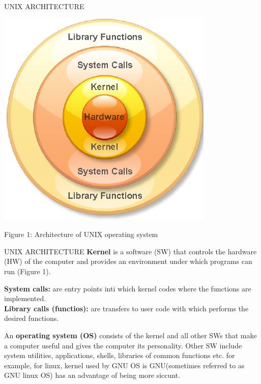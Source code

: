 \documentclass{beamer}
\begin{document}
\begin{frame}[t]{UNIX ARCHITECTURE}\vspace{10pt}
\begin{center}
\includegraphics[scale=0.5]{kernel.png}
\end{center}
Figure 1: Architecture of UNIX operating system

\end{frame}


\begin{frame}[t]{UNIX ARCHITECTURE}\vspace{4pt}
\textbf{Kernel} is a software (SW) that controls the hardware (HW) of the computer and provides an environment under which programs can run (Figure 1).

\textbf{System calls:} are entry points inti which kernel codes where the functions are implemented.\\[6pt]
\textbf{Library calls (functios):} are transfers to user code with which performs the desired functions.

An \textbf{operating system (OS)} consists of the kernel and all other SWs that make a computer useful and gives the computer its personality. Other SW include system utilities, applications, shells, libraries of common functions etc. for example, for linux, kernel used by GNU OS is GNU(sometimes referred to as GNU linux OS) has an advantage of being more siccunt.

\end{frame}
\end{document}
